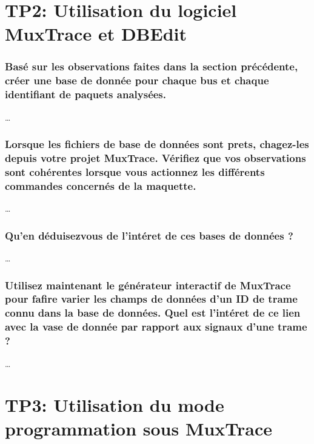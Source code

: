 \documentclass{rapportECC}
\begin{document}
\section{TP2: Utilisation du logiciel MuxTrace et DBEdit}

\subsubsection*{Basé sur les observations faites dans la section précédente, créer une base de donnée pour chaque bus et chaque identifiant de paquets analysées.}

\dots

\subsubsection*{Lorsque les fichiers de base de données sont prets, chagez-les depuis votre projet MuxTrace. Vérifiez que vos observations sont cohérentes lorsque vous actionnez les différents commandes concernés de la maquette.}

\dots

\subsubsection*{Qu'en déduisezvous de l'intéret de ces bases de données ?}

\dots

\subsubsection*{Utilisez maintenant le générateur interactif de MuxTrace pour fafire varier les champs de données d'un ID de trame connu dans la base de données. Quel est l'intéret de ce lien avec la vase de donnée par rapport aux signaux d'une trame ?}

\dots



\section{TP3: Utilisation du mode programmation sous MuxTrace}

\end{document}
